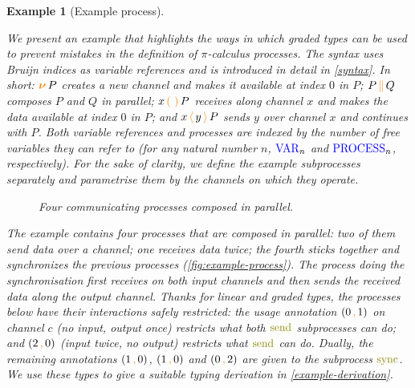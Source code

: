 \documentclass[sigplan,10pt,anonymous,review]{acmart}
\newtheorem{example}{Example}
\theoremstyle{definition}
\newcommand{\picalc}{$\pi$-calculus}
\newcommand{\type}[1]{\textcolor{blue}{\operatorname{#1}}}
\newcommand{\constr}[1]{\textcolor{orange}{\operatorname{#1}}}
\newcommand{\func}[1]{\textcolor{olive}{\operatorname{#1}}}
\newcommand{\comp}[2]{#1 \, \constr{\parallel} \, #2}
\newcommand{\new}{\constr{\boldsymbol{\nu}} \,}
\newcommand{\send}[2]{#1 \, \constr{\langle} \, #2 \,\constr{\rangle} \,}
\newcommand{\recv}[2]{#1 \, \constr{\mathbb{(}} \, #2 \, \constr{\mathbb{)}} \,}
\newcommand{\comma}{\, \constr{,} \,}
\newcommand{\Var}{\type{VAR}}
\newcommand{\Process}{\type{PROCESS}}
\begin{document}
\begin{example}[Example process]
\label{example-process}

We present an example that highlights the ways in which graded types can be used to prevent mistakes in the definition of \picalc{} processes.
The syntax uses Bruijn indices as variable references and is introduced in detail in \autoref{syntax}.
In short: $\new{} P$ creates a new channel and makes it available at index $0$ in $P$; $\comp{P}{Q}$ composes $P$ and $Q$ in parallel; $\recv{x}{}P$ receives along channel $x$ and makes the data available at index $0$ in $P$; and $\send{x}{y}{P}$ sends $y$ over channel $x$ and continues with $P$.
Both variable references and processes are indexed by the number of free variables they can refer to (for any natural number $n$, $\Var_n$ and $\Process_n$, respectively).
For the sake of clarity, we define the example subprocesses separately and parametrise them by the channels on which they operate.

\begin{figure}[h]
  \tiny
  \centering
  \caption{Four communicating processes composed in parallel.}
  \label{fig:example-process}
\end{figure}

The example contains four processes that are composed in parallel: two of them send data over a channel; one receives data twice; the fourth sticks together and synchronizes the previous processes (\autoref{fig:example-process}).
The process doing the synchronisation first receives on both input channels and then sends the received data along the output channel.
Thanks for linear and graded types, the processes below have their interactions safely restricted: the usage annotation $(0 \comma 1)$ on channel $c$ (no input, output once) restricts what both $\func{send}$ subprocesses can do; and $(2 \comma 0)$ (input twice, no output) restricts what $\func{send}$ can do.
Dually, the remaining annotations $(1 \comma 0)$, $(1 \comma 0)$ and $(0 \comma 2)$ are given to the subprocess $\func{sync}$.
We use these types to give a suitable typing derivation in \autoref{example-derivation}.


\end{example}
\end{document}
